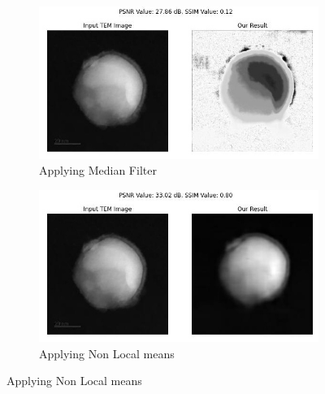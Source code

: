 \begin{figure}[H]
    \begin{subfigure}{.47\textwidth} %
        \includegraphics[width=\textwidth]{img/Results/Dataset_1/Dataset_1_median_filter.jpg}
        \caption{Applying Median Filter}
        \label{fig:Image3}
    \end{subfigure}
    \hfill
    \begin{subfigure}{.47\textwidth} %
        \includegraphics[width=\textwidth]{img/Results/Dataset_1/Dataset_1_non_local_means.jpg}
        \caption{Applying Non Local means}
        \label{fig:TEM_1_Image4}
    \end{subfigure}
    
    \vspace{15pt} %
    

\end{figure}
